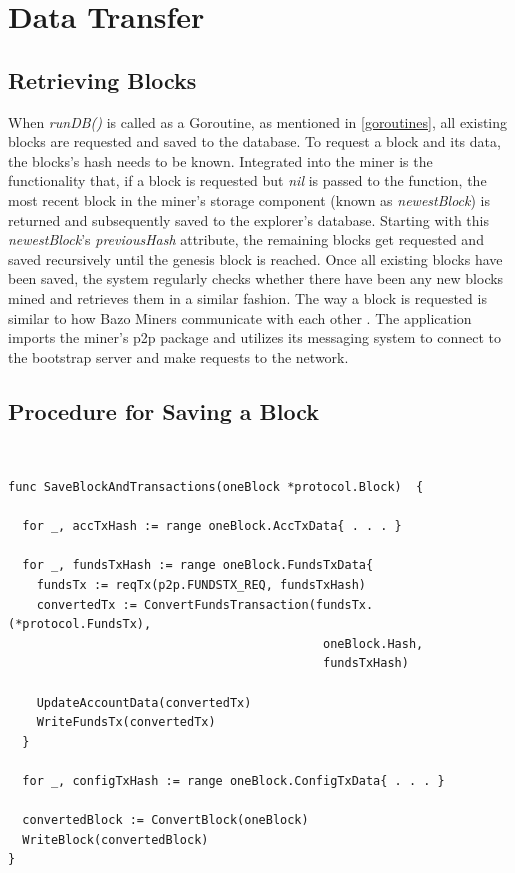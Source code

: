 \section{Data Transfer} \label{data}

\subsection{Retrieving Blocks} \label{retrieve}
When \emph{runDB()} is called as a Goroutine, as mentioned in \ref{goroutines}, all existing blocks are requested and saved to the database. To request a block and its data, the blocks's hash needs to be known. Integrated into the miner is the functionality that, if a block is requested but \emph{nil} is passed to the function, the most recent block in the miner's storage component (known as \emph{newestBlock}) is returned and subsequently saved to the explorer's database. Starting with this  \emph{newestBlock}'s \emph{previousHash} attribute, the remaining blocks get requested and saved recursively until the genesis block is reached. Once all existing blocks have been saved, the system regularly checks whether there have been any new blocks mined and retrieves them in a similar fashion.
The way a block is requested is similar to how Bazo Miners communicate with each other \cite{bazo}. The application imports the miner's p2p package and utilizes its messaging system to connect to the bootstrap server and make requests to the network.

\subsection{Procedure for Saving a Block} \

\begin{lstlisting}[caption={Saving a Block and Its Transactions to the Database},captionpos=b,label={lst:save}]
func SaveBlockAndTransactions(oneBlock *protocol.Block)  {

  for _, accTxHash := range oneBlock.AccTxData{ . . . }

  for _, fundsTxHash := range oneBlock.FundsTxData{
    fundsTx := reqTx(p2p.FUNDSTX_REQ, fundsTxHash)
    convertedTx := ConvertFundsTransaction(fundsTx.(*protocol.FundsTx), 
    										oneBlock.Hash, 
											fundsTxHash)

    UpdateAccountData(convertedTx)
    WriteFundsTx(convertedTx)
  }

  for _, configTxHash := range oneBlock.ConfigTxData{ . . . }

  convertedBlock := ConvertBlock(oneBlock)
  WriteBlock(convertedBlock)
}
\end{lstlisting}

